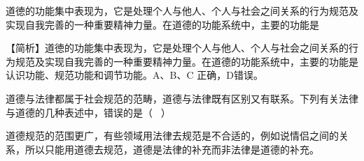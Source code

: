\question 道徳的功能集中表现为，它是处理个人与他人、个人与社会之间关系的行为规范及实现自我完善的一种重要精神力量。在道德的功能系统中，主要的功能是
\par{}
\begin{solution}【简析】道徳的功能集中表现为，它是处理个人与他人、个人与社会之间关系的行为规范及实现自我完善的一种重要精神力量。在道德的功能系统中，主要的功能是认识功能、规范功能和调节功能。A、B、C
正确，D错误。
\end{solution}
\question 道德与法律都属于社会规范的范畴，道德与法律既有区别又有联系。下列有关法律与道德的几种表述中，错误的是（
~）
\par{}
\begin{solution}道德规范的范围更广，有些领域用法律去规范是不合适的，例如说情侣之间的关系，所以只能用道德去规范，道德是法律的补充而非法律是道德的补充。
\end{solution}
